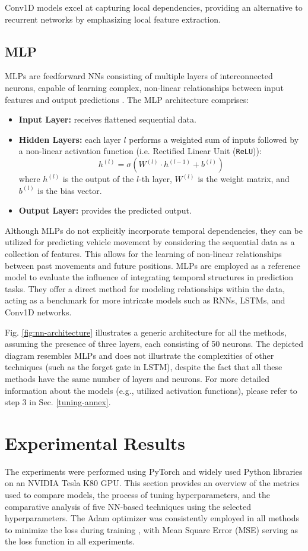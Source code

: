 \documentclass[conference]{IEEEtran}
\begin{document}
{Conv1D models excel at capturing local dependencies, providing an alternative to recurrent networks by emphasizing local feature extraction.

\subsection{MLP}
MLPs are feedforward NNs consisting of multiple layers of interconnected neurons, capable of learning complex, non-linear relationships between input features and output predictions \cite{cikm23zhang}. The MLP architecture comprises:
\begin{itemize}
    \item \textbf{Input Layer:} receives flattened sequential data.
    \item \textbf{Hidden Layers:} each layer \( l \) performs a weighted sum of inputs followed by a non-linear activation function (i.e. 
Rectified Linear Unit (\texttt{ReLU})):
    \[
    h^{(l)} = \sigma(W^{(l)} \cdot h^{(l-1)} + b^{(l)})
    \]
    where \( h^{(l)} \) is the output of the \( l \)-th layer, \( W^{(l)} \) is the weight matrix, and \( b^{(l)} \) is the bias vector.
    \item \textbf{Output Layer:} provides the predicted output.
\end{itemize}

Although MLPs do not explicitly incorporate temporal dependencies, they can be utilized for predicting vehicle movement by considering the sequential data as a collection of features. This allows for the learning of non-linear relationships between past movements and future positions. MLPs are employed as a reference model to evaluate the influence of integrating temporal structures in prediction tasks. They offer a direct method for modeling relationships within the data, acting as a benchmark for more intricate models such as RNNs, LSTMs, and Conv1D networks.

Fig. \ref{fig:nn-architecture} illustrates a generic architecture for all the methods, assuming the presence of three layers, each consisting of 50 neurons. The depicted diagram resembles MLPs and does not illustrate the complexities of other techniques (such as the forget gate in LSTM), despite the fact that all these methods have the same number of layers and neurons. For more detailed information about the models (e.g., utilized activation functions), please refer to step 3 in Sec. \ref{tuning-annex}.

\section{Experimental Results} \label{results}
The experiments were performed using PyTorch and widely used Python libraries on an NVIDIA Tesla K80 GPU. This section provides an overview of the metrics used to compare models, the process of tuning hyperparameters, and the comparative analysis of five NN-based techniques using the selected hyperparameters. The Adam optimizer was consistently employed in all methods to minimize the loss during training \cite{KingBa15}, with Mean Square Error (MSE) serving as the loss function in all experiments.

}
\end{document}
